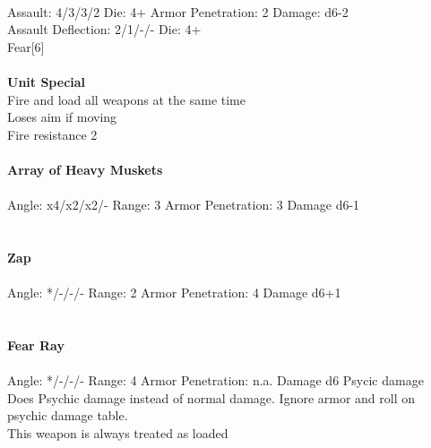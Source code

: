 \ \\
Assault: 4/3/3/2 Die: 4+ Armor Penetration: 2 Damage: d6-2 \\
Assault Deflection: 2/1/-/- Die: 4+\\
\indent Fear[6] \\
\ \\

{\bf Unit Special} \\
Fire and load all weapons at the same time\\ Loses aim if moving\\Fire resistance 2
\ \\
\ \\
{\bf Array of Heavy Muskets } \\
\ \\
Angle: x4/x2/x2/- Range: 3 Armor Penetration: 3 Damage d6-1 \\
\indent  \\



\ \\
{\bf Zap } \\
\ \\
Angle: */-/-/- Range: 2 Armor Penetration: 4 Damage d6+1 \\
\indent  \\



\ \\
{\bf Fear Ray } \\
\ \\
Angle: */-/-/- Range: 4 Armor Penetration: n.a. Damage d6 Psycic damage \\
\indent Does Psychic damage instead of normal damage. Ignore armor and roll on psychic damage table. \\ This weapon is always treated as loaded \\





